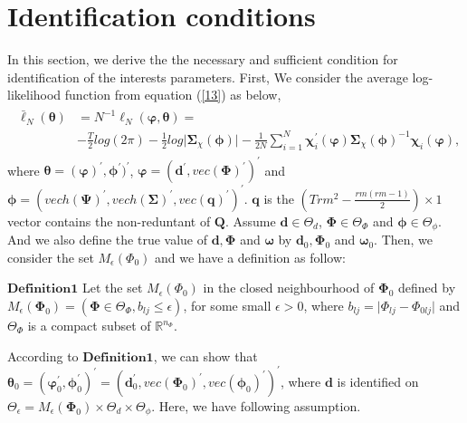 \documentclass[12pt,a4paper,hyperref]{article}
\begin{document}
\section{Identification conditions}
In this section, we derive the the necessary and sufficient condition for identification of the interests parameters.  First, We consider the average log-likelihood function from equation (\ref{13}) as below,
\begin{align}
\begin{split}
\bar{\ell}_{N}\left(\boldsymbol{\theta}\right)&=N^{-1} \ell_{N}(\boldsymbol{\varphi}, \boldsymbol{\theta})= \\
&-\frac{T}{2}log(2 \pi)-\frac{1}{2}log \vert \boldsymbol{\Sigma}_{\chi}(\boldsymbol{\phi}) \vert-\frac{1}{2N}\sum^{N}_{i=1} \boldsymbol{\chi}^{'}_{i}(\boldsymbol{\varphi})\boldsymbol{\Sigma}_{\chi}(\boldsymbol{\phi})^{-1}\boldsymbol{\chi}_{i}(\boldsymbol{\varphi}), \label{40}
\end{split}
\end{align}
where $\boldsymbol{\theta}=(\boldsymbol{\varphi})^{'}, \boldsymbol{\phi}^{'})^{'}$, $\boldsymbol{\varphi}=(\boldsymbol{d}^{'}, vec(\boldsymbol{\Phi})^{'})^{'}$ and $\boldsymbol{\phi}=(vech(\boldsymbol{\Psi})^{'}, vech(\boldsymbol{\Sigma})^{'},vec(\boldsymbol{q})^{'})^{'}$.
$\boldsymbol{q}$ is the $(Trm^{2}-\frac{rm(rm-1)}{2}) \times 1$ vector contains the non-reduntant of $\boldsymbol{Q}$. Assume $\boldsymbol{d}\in \Theta_{d}$, $\boldsymbol{\Phi} \in \Theta_{\Phi}$ and $\boldsymbol{\phi} \in \Theta_{\phi}$. And we also define the true value of $\boldsymbol{d}, \boldsymbol{\Phi}$ and $\boldsymbol{\omega}$ by $\boldsymbol{d}_{0}, \boldsymbol{\Phi}_{0}$ and $\boldsymbol{\omega}_{0}.$
Then, we consider the set $M_{\epsilon}(\Phi_{0})$ and we have a definition as follow:

$\boldsymbol{Definition 1}$ Let the set $M_{\epsilon}(\Phi_{0})$ in the closed neighbourhood of $\boldsymbol{\Phi}_{0}$ defined by
$M_{\epsilon}(\boldsymbol{\Phi}_{0})=\left(\boldsymbol{\Phi}\in \Theta_{\Phi}, b_{lj}\leq \epsilon  \right)$, for some small $\epsilon > 0$, where $ b_{lj}=\vert \Phi_{lj}-\Phi_{0lj}  \vert $ and $\Theta_{\Phi}$ is a compact subset of $\mathbb{R}^{n_{\Phi}}$.

According to $\boldsymbol{Definition 1}$, we can show that $\boldsymbol{\theta}_{0}=(\boldsymbol{\varphi}^{'}_{0}, \boldsymbol{\phi}^{'}_{0})^{'}=(\boldsymbol{d}^{'}_{0}, vec(\boldsymbol{\Phi}_{0})^{'}, vec(\boldsymbol{\phi}_{0})^{'}  )^{'}$, where $\boldsymbol{d}$ is identified on $\Theta_{\epsilon}=M_{\epsilon}(\boldsymbol{\Phi}_{0})\times \Theta_{d}\times \Theta_{\phi}$. Here, we have following assumption.
\end{document}
